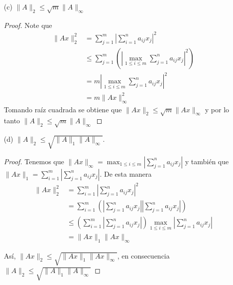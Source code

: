 \begin{enumerate}
    \begin{proof}
    Primero note que $\|A^Te_i\|_2^2=\displaystyle{\sum_{j=1}^n |a_{ij}|^2}\leq \|A^T\|_2^2= \|A\|_2^2$. Ahora, sea $k \in \{1,\ldots,m\}$ tal que $\|A^Te_k\|_2^2=\displaystyle{\max_{1\leq i \leq m}\sum_{j=1}^{n}|a_{ij}|^2}$; usando la desigualdad de Cauchy-Schwartz obtenemos el siguiente resultado:
    \begin{align*}
    \|A\|_\infty^{2} & =\left(\max_{1\leq i \leq m}{\sum_{j=1}^n|a_{ij}|}\right)^2\\ 
        &\leq n\max_{1\leq i \leq m}{\sum_{j=1}^n|a_{ij}|^2}\\   
        &= n\|A^Te_k\|_2^2\\
        &\leq n\|A^T\|_2^2\\
        &= n\|A\|_2^2
    \end{align*}
    Tomando raíz cuadrada llegamos a que $\|A\|_\infty \leq \sqrt{n}\|A\|_2$.
    \end{proof}
    \item[(c)] $\|A\|_2 \leq \sqrt{m} \|A\|_\infty$\\

    \begin{proof}
    Note que
    \begin{align*}
    \|Ax\|_2^2 &= \sum_{j=1}^m\left|\sum_{i=1}^n a_{ij}x_{j}\right|^2\\ 
    &\leq \sum_{j=1}^m\left(\left|\max_{1\leq i \leq m}{\sum_{j=1}^n a_{ij}x_{j}}\right|^2\right)\\ 
    &= m\left|\max_{1\leq i \leq m}{\sum_{j=1}^n a_{ij}x_{j}}\right|^2\\ 
    &= m\|Ax\|_\infty^2
    \end{align*}
    Tomando raíz cuadrada se obtiene que $\|Ax\|_2\leq \sqrt{m}\|Ax\|_\infty$ y por lo tanto $\|A\|_2 \leq\sqrt{m} \|A\|_\infty$
    \end{proof}
    \item[(d)] $\|A\|_2 \leq \sqrt{\|A\|_1 \|A\|_\infty}.$\\

    \begin{proof}
    Tenemos que $\|Ax\|_\infty = \displaystyle{\max_{1 \leq i \leq m}{\left|\sum_{j=1}^{n}a_{ij}x_j\right|}}$ y también que $\|Ax\|_1 =\displaystyle{ \sum_{i=1}^m\left|\sum_{j=1}^{n}a_{ij}x_{j}\right|}$. De esta manera
    \begin{align*}
    \|Ax\|_2^2 & = \sum_{i=1}^m\left|\sum_{j=1}^{n}a_{ij}x_{j}\right|^2 \\ 
    & = \sum_{i=1}^m\left(\left|\sum_{j=1}^{n}a_{ij}x_{j}\right|\left|\sum_{j=1}^{n}a_{ij}x_{j}\right|\right) \\ 
    &\leq \left(\sum_{i=1}^m\left|\sum_{j=1}^{n}a_{ij}x_{j}\right|\right)\max_{1\leq i \leq m}{\left|\sum_{j=1}^{n}a_{ij}x_{j}\right|} \\ 
    & = \|Ax\|_1 \|Ax\|_\infty
    \end{align*}

    Así, $\|Ax\|_2\leq \sqrt{\|Ax\|_1 \|Ax\|_\infty}$, en consecuencia $\|A\|_2 \leq \sqrt{\|A\|_1 \|A\|_\infty}$
    \end{proof}
\end{enumerate}